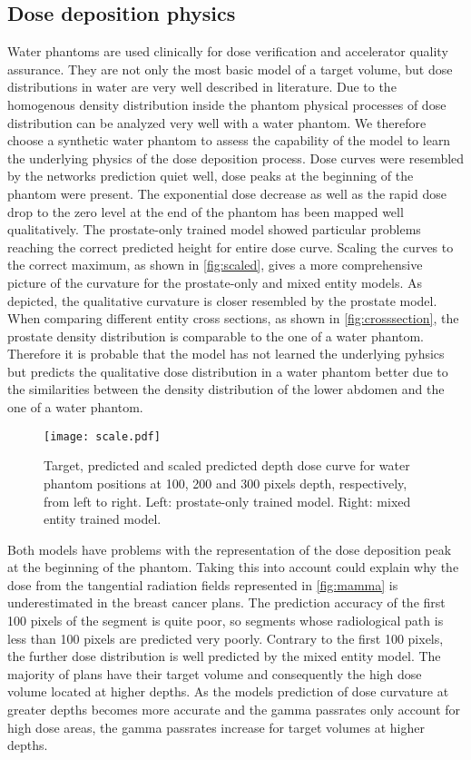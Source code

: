 \subsection{Dose deposition physics}

Water phantoms are used clinically for dose verification and accelerator quality assurance.
They are not only the most basic model of a target volume, but dose distributions in water are very well described in literature.
Due to the homogenous density distribution inside the phantom physical processes of dose distribution can be analyzed very well with a water phantom.
We therefore choose a synthetic water phantom to assess the capability of the model to learn the underlying physics of the dose deposition process.
Dose curves were resembled by the networks prediction quiet well, dose peaks at the beginning of the phantom were present. 
The exponential dose decrease as well as the rapid dose drop to the zero level at the end of the phantom has been mapped well qualitatively.
The prostate-only trained model showed particular problems reaching the correct predicted height for entire dose curve.
Scaling the curves to the correct maximum, as shown in \autoref{fig:scaled}, gives a more comprehensive picture of the curvature for the prostate-only and mixed entity models.
As depicted, the qualitative curvature is closer resembled by the prostate model. 
When comparing different entity cross sections, as shown in \autoref{fig:crosssection}, the prostate density distribution is comparable to the one of a water phantom. 
Therefore it is probable that the model has not learned the underlying pyhsics but predicts the qualitative dose distribution in a water phantom better due to the similarities between the density distribution of the lower abdomen and the one of a water phantom.

\begin{figure}
    \centering
    \texttt{[image: scale.pdf]}
    \caption{
        Target, predicted and scaled predicted depth dose curve for water phantom positions at 100, 200 and 300 pixels depth, respectively, from left to right. Left: prostate-only trained model. Right: mixed entity trained model. 
    }\label{fig:scaled}
\end{figure}

Both models have problems with the representation of the dose deposition peak at the beginning of the phantom.
Taking this into account could explain why the dose from the tangential radiation fields represented in \autoref{fig:mamma} is underestimated in the breast cancer plans.
The prediction accuracy of the first 100 pixels of the segment is quite poor, so segments whose radiological path is less than 100 pixels are predicted very poorly.
Contrary to the first 100 pixels, the further dose distribution is well predicted by the mixed entity model.
The majority of plans have their target volume and consequently the high dose volume located at higher depths.
As the models prediction of dose curvature at greater depths becomes more accurate and the gamma passrates only account for high dose areas, the gamma passrates increase for target volumes at higher depths.

